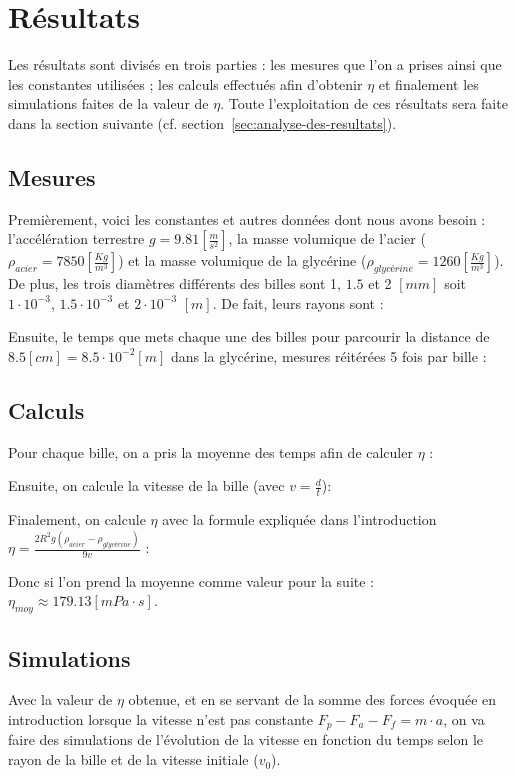\section{Résultats}\label{sec:resultats}
Les résultats sont divisés en trois parties : les mesures que l'on a prises ainsi que les constantes
utilisées ;
les calculs effectués afin d'obtenir $\eta $ et finalement les simulations faites de la valeur
de $\eta $.
Toute l'exploitation de ces résultats sera faite dans la section suivante (cf.
section~\ref{sec:analyse-des-resultats}).

\subsection{Mesures}\label{subsec:mesures}
Premièrement, voici les constantes et autres données dont nous avons besoin :
l'accélération terrestre $g= 9.81 \left[ \frac{m}{s^{2}} \right] $, la masse volumique de l'acier
($\rho_{acier} = 7850 \left[ \frac{Kg}{m^{3}} \right] $) et la masse volumique de la glycérine
($\rho_{glycérine} = 1260 \left[ \frac{Kg}{m^{3}} \right] $).
De plus, les trois diamètres différents des billes sont 1, $1.5$ et 2 $[mm]$ soit
$1\cdot 10^{-3}$, $1.5\cdot 10^{-3}$ et $2\cdot 10^{-3}$ $[m]$.
De fait, leurs rayons sont :

Ensuite, le temps que mets chaque une des billes pour parcourir la distance de $8.5 [cm] = 8.5 \cdot
10^{-2} [m]$ dans la glycérine, mesures réitérées 5 fois par bille :


\subsection{Calculs}\label{subsec:calculs}
Pour chaque bille, on a pris la moyenne des temps afin de calculer $\eta$ :

Ensuite, on calcule la vitesse de la bille (avec $v= \frac{d}{t} $):

Finalement, on calcule $\eta$ avec la formule expliquée dans l'introduction $\eta = \frac{2 R^{2} g (\rho_{acier} - \rho_{glycérine})}
{9 v} $ :

Donc si l'on prend la moyenne comme valeur pour la suite : $\eta_{moy} \approx 179.13 [mPa \cdot s] $.

\subsection{Simulations}\label{subsec:simulations}
Avec la valeur de $\eta$ obtenue, et en se servant de la somme des forces évoquée en introduction
lorsque la vitesse n'est pas constante $F_{p}-F_{a}-F_{f}=m \cdot a$, on va faire des simulations
de l'évolution de la vitesse en fonction du temps selon le rayon de la bille et de la vitesse
initiale ($v_{0}$).

